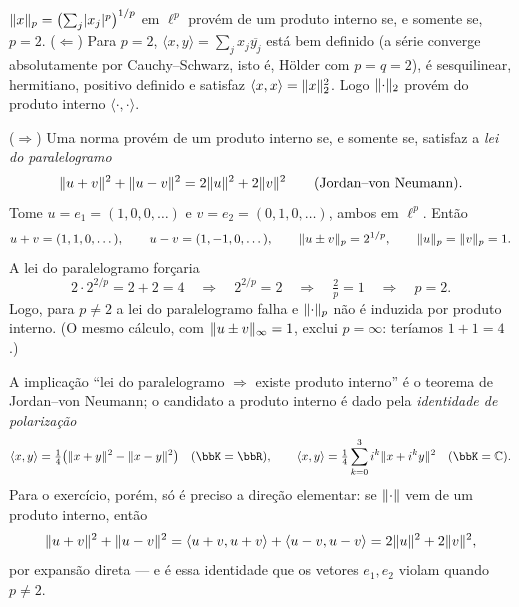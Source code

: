 \begin{exercicio}{$\lVert x\rVert_p=\bigl(\sum_j\lvert x_j\rvert^p\bigr)^{1/p}$ em $\ell^p$ provém de um produto interno se, e somente se, $p=2$.}
\sol
($\Leftarrow$) Para $p=2$, $\langle x,y\rangle=\sum_{j}x_j\overline{y_j}$ está bem definido (a série converge absolutamente por Cauchy--Schwarz, isto é, Hölder com $p=q=2$), é sesquilinear, hermitiano, positivo definido e satisfaz $\langle x,x\rangle=\lVert x\rVert_2^2$. Logo $\lVert\cdot\rVert_2$ provém do produto interno $\langle\cdot,\cdot\rangle$.

($\Rightarrow$) Uma norma provém de um produto interno se, e somente se, satisfaz a \emph{lei do paralelogramo}
\[ \lVert u+v\rVert^2+\lVert u-v\rVert^2=2\lVert u\rVert^2+2\lVert v\rVert^2 \qquad (\text{Jordan--von Neumann}). \]
Tome $u=e_1=(1,0,0,\dots)$ e $v=e_2=(0,1,0,\dots)$, ambos em $\ell^p$. Então
\[ u+v=(1,1,0,\dots),\qquad u-v=(1,-1,0,\dots),\qquad \lVert u\pm v\rVert_p=2^{1/p},\qquad \lVert u\rVert_p=\lVert v\rVert_p=1. \]
A lei do paralelogramo forçaria
\[ 2\cdot 2^{2/p}=2+2=4 \quad\Longrightarrow\quad 2^{2/p}=2 \quad\Longrightarrow\quad \tfrac{2}{p}=1 \quad\Longrightarrow\quad p=2. \]
Logo, para $p\neq 2$ a lei do paralelogramo falha e $\lVert\cdot\rVert_p$ não é induzida por produto interno. (O mesmo cálculo, com $\lVert u\pm v\rVert_\infty=1$, exclui $p=\infty$: teríamos $1+1=4$.)

\begin{obs}
A implicação ``lei do paralelogramo $\Rightarrow$ existe produto interno'' é o teorema de Jordan--von Neumann; o candidato a produto interno é dado pela \emph{identidade de polarização}
\[ \langle x,y\rangle=\tfrac14\bigl(\norm{x+y}^2-\norm{x-y}^2\bigr) \quad(\bbK=\R),\qquad \langle x,y\rangle=\tfrac14\sum_{k=0}^{3}i^k\norm{x+i^ky}^2 \quad(\bbK=\mathbb{C}). \]
Para o exercício, porém, só é preciso a direção elementar: se $\lVert\cdot\rVert$ vem de um produto interno, então
\[ \lVert u+v\rVert^2+\lVert u-v\rVert^2=\langle u+v,u+v\rangle+\langle u-v,u-v\rangle=2\lVert u\rVert^2+2\lVert v\rVert^2, \]
por expansão direta --- e é essa identidade que os vetores $e_1,e_2$ violam quando $p\neq2$.
\end{obs}
\end{exercicio}

